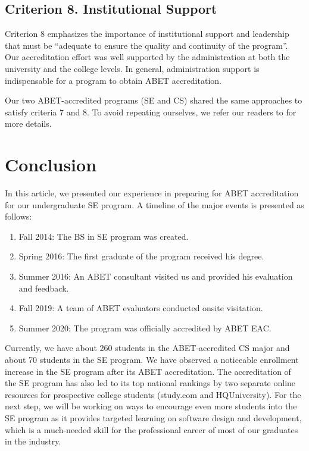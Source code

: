 \documentclass{article}
\begin{document}
\subsection{Criterion 8. Institutional Support}
Criterion 8 emphasizes the importance of institutional support and leadership that must be ``adequate to ensure the quality and continuity of the program''.  Our accreditation effort was well supported by the administration at both the university and the college levels.  In general, administration support is indispensable for a program to obtain ABET accreditation.  

Our two ABET-accredited programs (SE and CS) shared the same approaches to satisfy criteria 7 and 8.  To avoid repeating ourselves, we refer our readers to \cite{fu14} for more details.

\section{Conclusion}
In this article, we presented our experience in preparing for ABET accreditation for our undergraduate SE program.  A timeline of the major events is presented as follows:
\begin{enumerate}[noitemsep]
\item Fall 2014: 		The BS in SE program was created.
\item Spring 2016: 	The first graduate of the program received his degree.  
\item Summer 2016: 	An ABET consultant visited us and provided his evaluation and feedback.  
\item Fall 2019: 		A team of ABET evaluators conducted onsite visitation.  
\item Summer 2020: 	The program was officially accredited by ABET EAC.  
\end{enumerate}

Currently, we have about 260 students in the ABET-accredited CS major and about 70 students in the SE program.  We have observed a noticeable enrollment increase in the SE program after its ABET accreditation.  The accreditation of the SE program has also led to its top national rankings by two separate online resources for prospective college students (study.com and HQUniversity).  For the next step, we will be working on ways to encourage even more students into the SE program as it provides targeted learning on software design and development, which is a much-needed skill for the professional career of most of our graduates in the industry.  

\medskip



\end{document}
